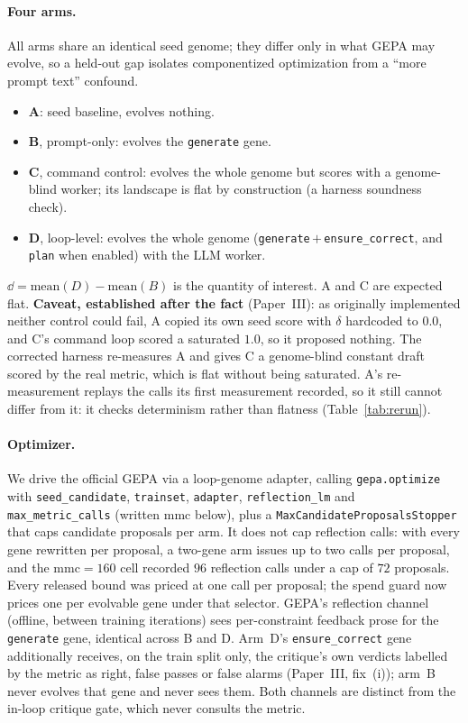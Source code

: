 \documentclass[11pt]{article}
\begin{document}
\paragraph{Four arms.}
All arms share an identical seed genome; they differ only in what GEPA may
evolve, so a held-out gap isolates componentized optimization from a
``more prompt text'' confound.
\begin{itemize}
  \item \textbf{A}: seed baseline, evolves nothing.
  \item \textbf{B}, prompt-only: evolves the \texttt{generate} gene.
  \item \textbf{C}, command control: evolves the whole genome but scores with
    a genome-blind worker; its landscape is flat by construction (a harness
    soundness check).
  \item \textbf{D}, loop-level: evolves the whole genome
    (\texttt{generate}\,$+$\,\texttt{ensure\_correct}, and \texttt{plan} when
    enabled) with the LLM worker.
\end{itemize}
$\dd = \mathrm{mean}(D) - \mathrm{mean}(B)$ is the quantity of interest.
A and C are expected flat. \textbf{Caveat, established after the fact} (Paper~III): as originally
implemented neither control could fail, A copied its
own seed score with $\delta$ hardcoded to $0.0$, and C's command loop scored a saturated
$1.0$, so it proposed nothing. The corrected harness re-measures A and gives C a
genome-blind constant draft scored by the real metric, which is flat without being
saturated. A's re-measurement replays the calls its first measurement recorded, so it still
cannot differ from it: it checks determinism rather than flatness (Table~\ref{tab:rerun}).

\paragraph{Optimizer.}
We drive the official GEPA \citep{agrawal2025gepa} via a loop-genome adapter, calling
\texttt{gepa.optimize} with \texttt{seed\_candidate}, \texttt{trainset}, \texttt{adapter},
\texttt{reflection\_lm} and \texttt{max\_metric\_calls} (written $\mathrm{mmc}$ below), plus a
\texttt{MaxCandidateProposalsStopper} that caps candidate proposals per arm. It does not cap
reflection calls: with every gene rewritten per proposal, a two-gene arm issues up to two calls
per proposal, and the $\mathrm{mmc}=160$ cell recorded $96$ reflection calls under a cap of $72$
proposals. Every released bound was priced at one call per proposal; the spend guard now prices
one per evolvable gene under that selector. GEPA's reflection channel (offline, between
training iterations) sees per-constraint feedback prose for the \texttt{generate} gene, identical
across B and D. Arm~D's \texttt{ensure\_correct} gene additionally receives, on the train split
only, the critique's own verdicts labelled by the metric as right, false passes or false alarms
(Paper~III, fix~(i)); arm~B never evolves that gene and never sees them. Both channels are
distinct from the in-loop critique gate, which never consults the metric.
\end{document}
